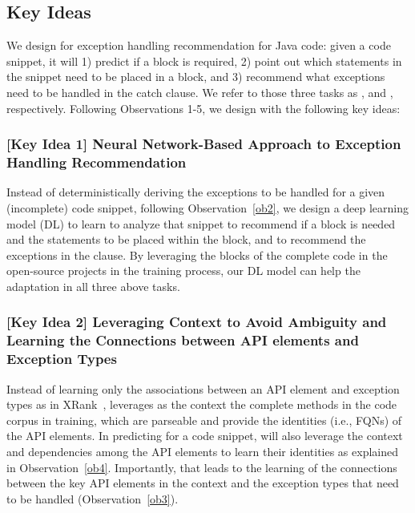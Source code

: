 \subsection{Key Ideas}
\label{key:sec}

\noindent We design {\tool} for exception handling recommendation for
Java code: given a code snippet, it will 1) predict if a
 block is required, 2) point out which statements in
the snippet need to be placed in a  block, and 3)
recommend what exceptions need to be handled in the catch clause. We
refer to those three tasks as {\xblock}, {\xstate} and {\xtype},
respectively. Following Observations 1-5, we design {\tool} with the
following key ideas:

\subsubsection{{\bf [Key Idea 1] Neural Network-Based Approach to Exception Handling Recommendation}}
Instead of deterministically deriving the exceptions to be handled for
a given (incomplete) code snippet, following Observation~\ref{ob2}, we
design a deep learning model (DL) to learn to analyze that snippet to
recommend if a  block is needed and the statements to
be placed within the  block, and to recommend the
exceptions in the  clause.  By leveraging the
 blocks of the complete code in the open-source
projects in the training process, our DL model can help the adaptation
in all three above tasks.


\vspace{2pt}
\subsubsection{{\bf [Key Idea 2] Leveraging Context to Avoid
Ambiguity and Learning the Connections between API elements and
Exception Types}} Instead of learning only the associations between an
API element and exception types as in XRank~\cite{xrank-fse20},
{\tool} leverages as the context the complete methods in the code
corpus in training, which are parseable and provide the identities
(i.e., FQNs) of the API elements. In predicting for a code snippet,
{\tool} will also leverage the context and dependencies among the API
elements to learn their identities as explained in
Observation~\ref{ob4}. Importantly, that leads to the learning of the
connections between the key API elements in the context and the
exception types that need to be handled (Observation~\ref{ob3}).

